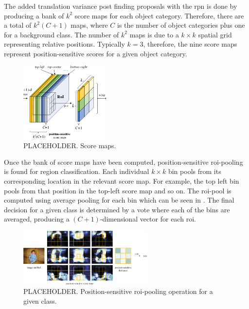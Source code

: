 The added translation variance post finding proposals with the \gls{rpn} is done by producing a bank of $k^2$ score maps for each object category. Therefore, there are a total of $k^2(C + 1)$ maps, where $C$ is the number of object categories plus one for a background class. The number of $k^2$ maps is due to a $k \times k$ spatial grid representing relative positions. Typically $k = 3$, therefore, the nine score maps represent position-sensitive scores for a given object category.

\begin{figure}[H]
  \centering
    \includegraphics[width=0.4\textwidth]{Figs/Techanal/scoremaps.png}
     \caption{PLACEHOLDER. Score maps.}
    \label{fig:scoremaps}
\end{figure}

Once the bank of score maps have been computed, position-sensitive \gls{roi}-pooling is found for region classification. Each individual $k \times k$ bin pools from its corresponding location in the relevant score map. For example, the top left bin pools from that position in the top-left score map and so on. The \gls{roi}-pool is computed using average pooling for each bin which can be seen in . The final decision for a given class is determined by a vote where each of the bins are averaged, producing a $(C+1)$-dimensional vector for each \gls{roi}.

\begin{figure}[H]
  \centering
    \includegraphics[width=0.6\textwidth]{Figs/Techanal/rfcnpooling.png}
      \caption{PLACEHOLDER. Position-sensitive \gls{roi}-pooling operation for a given class.}
    \label{fig:rfcnpooling}
\end{figure}

